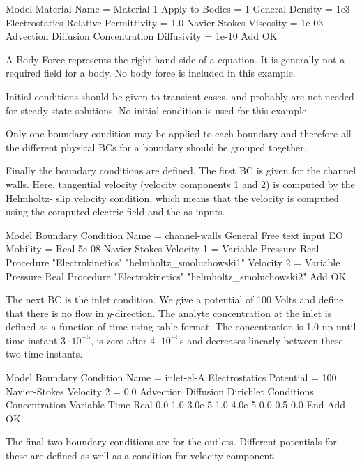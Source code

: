 \ttbegin
Model
  Material
    Name = Material 1
    Apply to Bodies = 1 
      General
        Density = 1e3
      Electrostatics
        Relative Permittivity = 1.0
      Navier-Stokes
        Viscosity = 1e-03
      Advection Diffusion
        Concentration Diffusivity = 1e-10
    Add
    OK
\ttend

A Body Force represents the right-hand-side of a equation. It is generally not a required field for a body.   No body force is included in this example.

Initial conditions should be given to transient cases, and probably are not needed for steady state solutions. No initial condition is used for this example.

Only one boundary condition may be applied to each boundary and therefore all the different physical BCs for a boundary should be grouped together. 

Finally the boundary conditions are defined. The first BC is given for the channel walls. Here, tangential velocity (velocity components 1 and 2) is computed by the Helmholtz- slip velocity condition, which means that the velocity is computed using the computed electric field and the  as inputs. 

\ttbegin
Model
  Boundary Condition
    Name = channel-walls
    General
      Free text input
        EO Mobility = Real 5e-08
    Navier-Stokes 
      Velocity 1 = Variable Pressure
         Real Procedure  "Electrokinetics" "helmholtz_smoluchowski1"
      Velocity 2 = Variable Pressure
         Real Procedure  "Electrokinetics" "helmholtz_smoluchowski2"
    Add
    OK
\ttend  

The next BC is the inlet condition. We give a potential of 100 Volts and define that there is no flow in $y$-direction. The analyte concentration at the inlet is defined as a function of time using table format. The concentration is 1.0 up until time instant $3\cdot 10^{-5}$, is zero after $4\cdot 10^{-5}$s and decreases linearly between these two time instants.

\ttbegin
Model
  Boundary Condition
    Name = inlet-el-A
    Electrostatics
     Potential = 100
    Navier-Stokes 
      Velocity 2 = 0.0
    Advection Diffusion
      Dirichlet Conditions
        Concentration
            Variable Time
              Real
              0.0     1.0
              3.0e-5  1.0
              4.0e-5  0.0
              0.5     0.0
           End           
    Add
   OK 
\ttend   

The final two boundary conditions are for the outlets. Different potentials for these are defined as well as a condition for velocity component.


